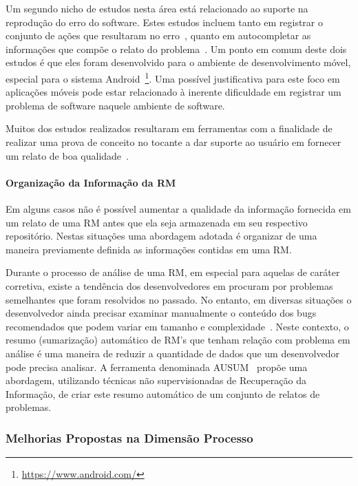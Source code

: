 Um segundo nicho de estudos  nesta área está relacionado ao suporte na
reprodução do erro do software. Estes estudos incluem tanto em registrar o
conjunto de ações que resultaram no erro~\cite{White:2015:GRR:2820282.2820291},
quanto em autocompletar as informações que compõe o relato do
problema~\cite{moran2015auto}. Um ponto em comum deste dois estudos é que eles
foram desenvolvido para o ambiente de desenvolvimento móvel, especial para o
sistema Android~\footnote{\url{https://www.android.com/}}. Uma possível
justificativa para este foco em aplicações móveis pode estar relacionado à
inerente dificuldade em registrar um problema de software naquele ambiente de
software.

Muitos dos estudos realizados resultaram em ferramentas com a finalidade de
realizar uma prova de conceito no tocante a dar suporte ao usuário em fornecer
um relato de boa qualidade~\cite{Tu:2014:MQI:2677832.2677844, Bettenburg2008a,
	Wu2011a,White:2015:GRR:2820282.2820291,moran2015auto}. 

\paragraph{Organização da Informação da RM}

Em alguns casos não é possível aumentar a qualidade da informação fornecida
em um relato de uma RM antes que ela seja armazenada em seu respectivo
repositório.  Nestas situações uma abordagem adotada é organizar de uma
maneira previamente definida as informações contidas em uma RM\@.

Durante o processo de análise de uma RM, em especial para aquelas de caráter
corretiva, existe a tendência dos desenvolvedores em procuram por problemas
semelhantes que foram resolvidos no passado. No entanto, em diversas situações o
desenvolvedor ainda precisar examinar manualmente o conteúdo dos bugs
recomendados que podem variar em tamanho e complexidade~\cite{mani2012ausum}.
Neste contexto, o resumo (sumarização) automático de RM's que tenham relação com
problema em análise é uma maneira de reduzir a quantidade de dados que um
desenvolvedor pode precisa analisar. A ferramenta denominada
AUSUM~\cite{mani2012ausum} propõe uma abordagem, utilizando técnicas não
supervisionadas de Recuperação da Informação, de criar este resumo automático de
um conjunto de relatos de problemas.

\subsubsection{Melhorias Propostas na Dimensão Processo}
\label{ssub:melhorias_dim_processo}

